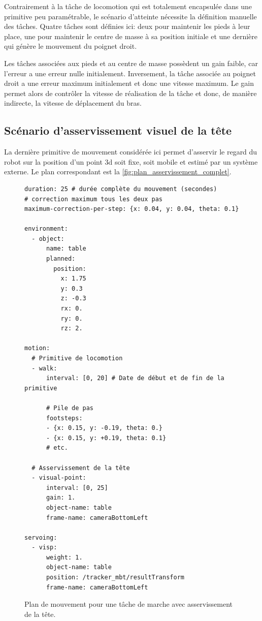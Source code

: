 Contrairement à la tâche de locomotion qui est totalement encapsulée
dans une primitive peu paramétrable, le scénario d'atteinte nécessite
la définition manuelle des tâches. Quatre tâches sont définies ici:
deux pour maintenir les pieds à leur place, une pour maintenir le
centre de masse à sa position initiale et une dernière qui génère le
mouvement du poignet droit.

Les tâches associées aux pieds et au centre de masse possèdent un gain
faible, car l'erreur a une erreur nulle initialement. Inversement, la
tâche associée au poignet droit a une erreur maximum initialement et
donc une vitesse maximum. Le gain permet alors de contrôler la vitesse
de réalisation de la tâche et donc, de manière indirecte, la vitesse
de déplacement du bras.

\FloatBarrier

\subsection{Scénario d'asservissement visuel de la tête}

La dernière primitive de mouvement considérée ici permet d'asservir le
regard du robot sur la position d'un point 3d soit fixe, soit mobile
et estimé par un système externe. Le plan correspondant est la
\autoref{fig:plan_asservissement_complet}.

\begin{figure}
  \footnotesize
  \begin{center}
\begin{verbatim}
duration: 25 # durée complète du mouvement (secondes)
# correction maximum tous les deux pas
maximum-correction-per-step: {x: 0.04, y: 0.04, theta: 0.1}

environment:
  - object:
      name: table
      planned:
        position:
          x: 1.75
          y: 0.3
          z: -0.3
          rx: 0.
          ry: 0.
          rz: 2.

motion:
  # Primitive de locomotion
  - walk:
      interval: [0, 20] # Date de début et de fin de la primitive

      # Pile de pas
      footsteps:
      - {x: 0.15, y: -0.19, theta: 0.}
      - {x: 0.15, y: +0.19, theta: 0.1}
      # etc.

  # Asservissement de la tête
  - visual-point:
      interval: [0, 25]
      gain: 1.
      object-name: table
      frame-name: cameraBottomLeft

servoing:
  - visp:
      weight: 1.
      object-name: table
      position: /tracker_mbt/resultTransform
      frame-name: cameraBottomLeft
\end{verbatim}
  \end{center}
  \caption{Plan de mouvement pour une tâche de marche avec
    asservissement de la tête.\label{fig:plan_asservissement_complet}}
\end{figure}

